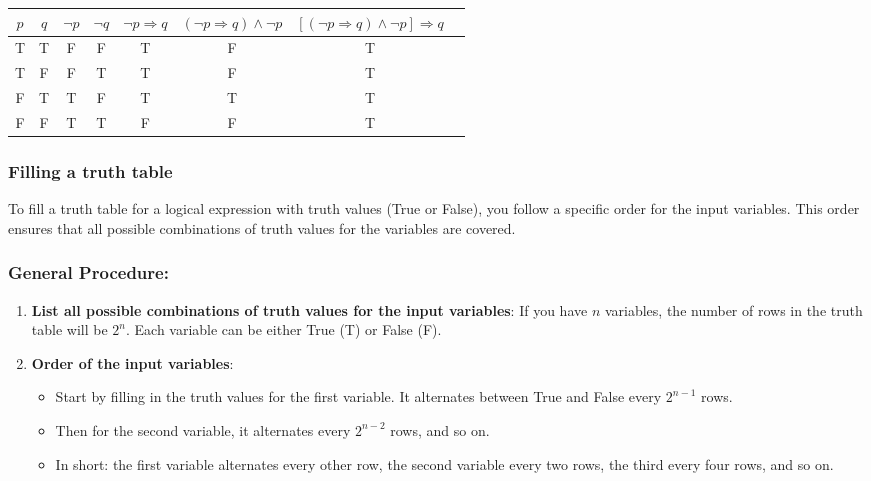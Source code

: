 \begin{center}
\begin{tabular}{|c|c|c|c|c|c|c|c|}
\hline
$p$ & $q$ & $\neg p$ & $\neg q$ & $\neg p \Rightarrow q$ & $(\neg p \Rightarrow q) \land \neg p$ & $\left[(\neg p \Rightarrow q) \land \neg p\right] \Rightarrow q$ \\
\hline
T & T & F & F & T & F & T \\
T & F & F & T & T & F & T \\
F & T & T & F & T & T & T \\
F & F & T & T & F & F & T \\
\hline
\end{tabular}
\end{center}

\subsubsection{Filling a truth table}
To fill a truth table for a logical expression with truth values (True or False), you follow a specific order for the input variables. This order ensures that all possible combinations of truth values for the variables are covered.

\subsubsection{General Procedure:}
\begin{enumerate}
    \item \textbf{List all possible combinations of truth values for the input variables}: If you have \(n\) variables, the number of rows in the truth table will be \(2^n\). Each variable can be either True (T) or False (F).
   
    \item \textbf{Order of the input variables}:
    \begin{itemize}
        \item Start by filling in the truth values for the first variable. It alternates between True and False every \(2^{n-1}\) rows.
        \item Then for the second variable, it alternates every \(2^{n-2}\) rows, and so on.
        \item In short: the first variable alternates every other row, the second variable every two rows, the third every four rows, and so on.
    \end{itemize}
\end{enumerate}

